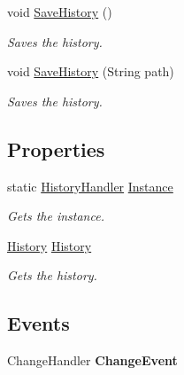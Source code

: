\begin{DoxyCompactItemize}
void \hyperlink{class_assessment___two___logic_1_1_model_1_1_history_handler_a0427bc9671a3154229cc564271a51089}{SaveHistory} ()
\begin{DoxyCompactList}\small\item\em Saves the history. \item\end{DoxyCompactList}\item 
void \hyperlink{class_assessment___two___logic_1_1_model_1_1_history_handler_ac198e67cd38d0b248b7917fdd5a9006c}{SaveHistory} (String path)
\begin{DoxyCompactList}\small\item\em Saves the history. \item\end{DoxyCompactList}\end{DoxyCompactItemize}
\subsection*{Properties}
\begin{DoxyCompactItemize}
\item 
static \hyperlink{class_assessment___two___logic_1_1_model_1_1_history_handler}{HistoryHandler} \hyperlink{class_assessment___two___logic_1_1_model_1_1_history_handler_a299097380605ceea09d4fb12ee4f9295}{Instance}
\begin{DoxyCompactList}\small\item\em Gets the instance. \item\end{DoxyCompactList}\item 
\hyperlink{class_assessment___two___logic_1_1_model_1_1_history}{History} \hyperlink{class_assessment___two___logic_1_1_model_1_1_history_handler_ad0d038e7cdd96dfded12b1186d2cbd3e}{History}
\begin{DoxyCompactList}\small\item\em Gets the history. \item\end{DoxyCompactList}\end{DoxyCompactItemize}
\subsection*{Events}
\begin{DoxyCompactItemize}
\item 
\hypertarget{class_assessment___two___logic_1_1_model_1_1_history_handler_a09e2c3b597cb9f0a46871b60e4833cee}{
ChangeHandler {\bfseries ChangeEvent}}
\label{class_assessment___two___logic_1_1_model_1_1_history_handler_a09e2c3b597cb9f0a46871b60e4833cee}

\end{DoxyCompactItemize}


